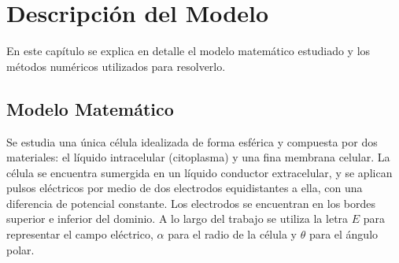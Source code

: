 \chapter{Descripción del Modelo} \label{chap:modelo}




En este capítulo se explica en detalle el modelo matemático estudiado y los métodos numéricos utilizados para resolverlo.

\section{Modelo Matemático}

Se estudia una única célula idealizada de forma esférica y compuesta por dos materiales: el líquido intracelular (citoplasma) y una fina membrana celular. La célula se encuentra sumergida en un líquido conductor extracelular, y se aplican pulsos eléctricos por medio de dos electrodos equidistantes a ella, con una diferencia de potencial constante. Los electrodos se encuentran en los bordes superior e inferior del dominio. A lo largo del trabajo se utiliza la letra $E$ para representar el campo eléctrico, $\alpha$ para el radio de la célula y $\theta$ para el ángulo polar.



